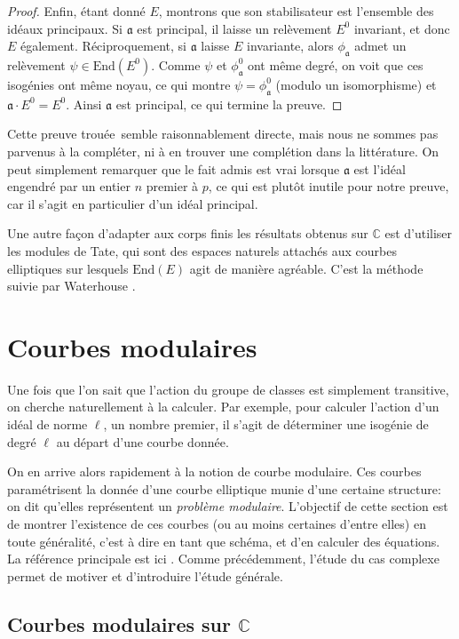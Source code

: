 \documentclass[11pt,a4paper]{article}
\newcommand{\C}{\mathbb{C}}
\newcommand{\End}{\mathrm{End}}
\renewcommand{\frak}{\mathfrak}
\renewcommand{\v}{\vspace{5mm}}
\theoremstyle{definition}
\begin{document}
\begin{proof}
Enfin, étant donné $E$, montrons que son stabilisateur est l'ensemble des idéaux principaux. Si $\frak a$ est principal, il laisse un relèvement $E^0$ invariant, et donc $E$ également. Réciproquement, si $\frak a$ laisse $E$ invariante, alors $\phi_{\frak a}$ admet un relèvement $\psi\in \End(E^0)$. Comme $\psi$ et $\phi_{\frak a}^0$ ont même degré, on voit que ces isogénies ont même noyau, ce qui montre $\psi=\phi_{\frak a}^0$ (modulo un isomorphisme) et $\frak a\cdot E^0 = E^0$. Ainsi $\frak a$ est principal, ce qui termine la preuve.
\end{proof}
\v

Cette preuve \og trouée\fg\ semble raisonnablement directe, mais nous ne sommes pas parvenus à la compléter, ni à en trouver une complétion dans la littérature. On peut simplement remarquer que le fait admis est vrai lorsque $\frak a$ est l'idéal engendré par un entier $n$ premier à $p$, ce qui est plutôt inutile pour notre preuve, car il s'agit en particulier d'un idéal principal.

Une autre façon d'adapter aux corps finis les résultats obtenus sur $\C$ est d'utiliser les modules de Tate, qui sont des espaces naturels attachés aux courbes elliptiques sur lesquels $\End(E)$ agit de manière agréable. C'est la méthode suivie par Waterhouse \cite{Waterhouse}.


\newpage

\section{Courbes modulaires}

Une fois que l'on sait que l'action du groupe de classes est simplement transitive, on cherche naturellement à la calculer. Par exemple, pour calculer l'action d'un idéal de norme $\ell$, un nombre premier, il s'agit de déterminer une isogénie de degré $\ell$ au départ d'une courbe donnée.

On en arrive alors rapidement à la notion de courbe modulaire. Ces courbes paramétrisent la donnée d'une courbe elliptique munie d'une certaine structure: on dit qu'elles représentent un \emph{problème modulaire}. L'objectif de cette section est de montrer l'existence de ces courbes (ou au moins certaines d'entre elles) en toute généralité, c'est à dire en tant que schéma, et d'en calculer des équations. La référence principale est ici \cite{KaMa}. Comme précédemment, l'étude du cas complexe permet de motiver et d'introduire l'étude générale.


\subsection{Courbes modulaires sur $\C$}
\end{document}
